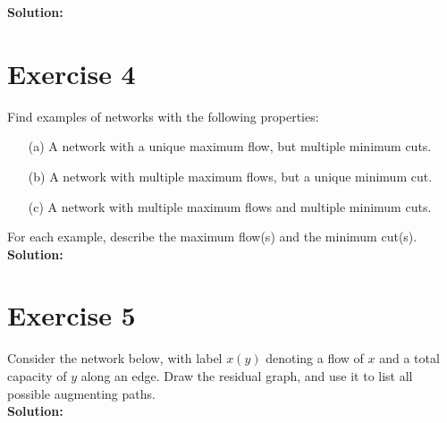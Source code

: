 \documentclass{article}
\begin{document}
\textbf{Solution:} \\



\newpage

\section*{Exercise 4}
Find examples of networks with the following properties:

\begin{itemize}
    \item[(a)] A network with a unique maximum flow, but multiple minimum cuts.
    \item[(b)] A network with multiple maximum flows, but a unique minimum cut.
    \item[(c)] A network with multiple maximum flows and multiple minimum cuts.
\end{itemize}

For each example, describe the maximum flow(s) and the minimum cut(s). \\

\textbf{Solution:} \\



\newpage

\section*{Exercise 5}
Consider the network below, with label $x(y)$ denoting a flow of $x$ and a total capacity of $y$ along an edge. Draw the residual graph, and use it to list all possible augmenting paths. \\

\textbf{Solution:} \\
\end{document}
